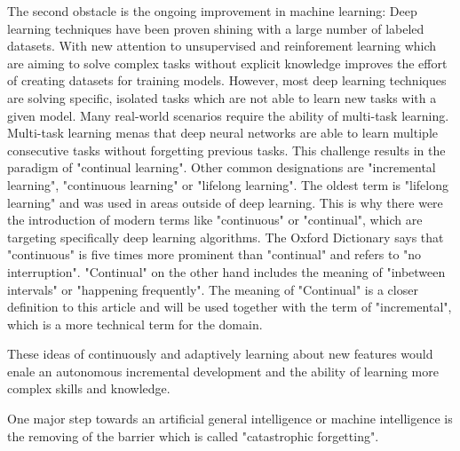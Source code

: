 The second obstacle is the ongoing improvement in machine learning: 
\hfill \break
Deep learning techniques have been proven shining with a large number of labeled datasets.
With new attention to unsupervised and reinforement learning which are aiming to solve complex tasks without explicit knowledge improves the effort of creating datasets for training models.
However, most deep learning techniques are solving specific, isolated tasks which are not able to learn new tasks with a given model.
\cite{continual-ai-blog}
Many real-world scenarios require the ability of multi-task learning.
Multi-task learning menas that deep neural networks are able to learn multiple consecutive tasks without forgetting previous tasks.
This challenge results in the paradigm of "continual learning".
Other common designations are "incremental learning", "continuous learning" or "lifelong learning".
The oldest term is "lifelong learning" and was used in areas outside of deep learning.
\cite{continual-ai-blog}
This is why there were the introduction of modern terms like "continuous" or "continual", which are targeting specifically deep learning algorithms.
\cite{continual-ai-blog}
The Oxford Dictionary says that "continuous" is five times more prominent than "continual" and refers to "no interruption". "Continual" on the other hand includes the meaning of "inbetween intervals" or "happening frequently".
\cite{oxford-continual-continuous}
The meaning of "Continual" is a closer definition to this article and will be used together with the term of "incremental", which is a more technical term for the domain.
\hfill \break



These ideas of continuously and adaptively learning about new features would enale an autonomous incremental development and the ability of learning more complex skills and knowledge.
\cite{continual-ai-blog}

One major step towards an artificial general intelligence or machine intelligence is the removing of the barrier which is called "catastrophic forgetting".


